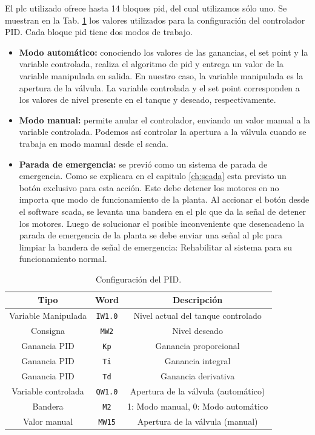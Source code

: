 El \gls{plc} utilizado ofrece hasta 14 bloques \gls{pid}, del cual utilizamos
sólo uno.
Se muestran en la Tab. \ref{table:controladorpid} los valores utilizados para
la configuración del controlador PID.
Cada bloque \gls{pid} tiene dos modos de trabajo.
\begin{itemize}
 \item \textbf{Modo automático:} conociendo los valores de las ganancias, el
set point y la variable controlada, realiza el algoritmo de \gls{pid} y entrega
un valor de la variable manipulada en salida.
En nuestro caso, la variable manipulada es la apertura de la válvula.
La variable controlada y el set point corresponden a los valores de nivel
presente en el tanque y deseado, respectivamente.
 \item \textbf{Modo manual:} permite anular el controlador, enviando un valor
manual a la variable controlada.
Podemos así controlar la apertura a la válvula cuando se
trabaja en modo manual desde el \gls{scada}.
 \item \textbf{Parada de emergencia:} se previó como un sistema de parada de emergencia.
 Como se explicara en el capitulo \ref{ch:scada} esta previsto un
 botón exclusivo para esta acción. Este debe detener
 los motores en no importa que modo de funcionamiento de la planta. Al accionar el 
 botón desde el software \gls{scada}, se levanta una bandera en el \gls{plc}
 que da la señal de detener los motores. Luego de solucionar el posible inconveniente
 que desencadeno la parada de emergencia de la planta se debe enviar una señal 
 al \gls{plc} para limpiar la bandera de señal de emergencia: Rehabilitar al 
sistema para su funcionamiento normal.
\end{itemize}

\begin{table}[!t]
\renewcommand{\arraystretch}{1.3}
\centering
\begin{tabular}{c||c||c}
\hline
\bfseries Tipo & \bfseries Word  & \bfseries Descripción\\
\hline \hline
Variable Manipulada & \verb|IW1.0|  & Nivel actual del tanque controlado\\
Consigna & \verb|MW2|  & Nivel deseado\\
Ganancia PID & \verb|Kp|  & Ganancia proporcional\\
Ganancia PID & \verb|Ti|  & Ganancia integral\\
Ganancia PID & \verb|Td|  & Ganancia derivativa\\
Variable controlada & \verb|QW1.0|  &  Apertura de la válvula (automático)\\
Bandera & \verb|M2|  & 1: Modo manual, 0: Modo automático \\
Valor manual & \verb|MW15|  & Apertura de la válvula (manual)\\
\hline
\end{tabular}
\caption{Configuración del PID.}
\label{table:controladorpid}
\end{table}

